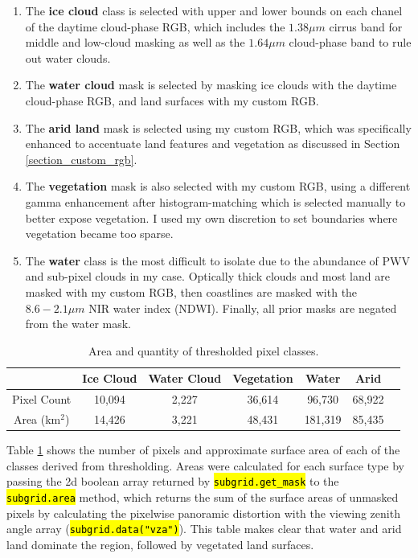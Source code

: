 \documentclass[12pt]{article}
\newcommand{\hltexttt}[1]{\texttt{\hl{#1}}}
\begin{document}
\begin{enumerate}
    \item{The \textbf{ice cloud} class is selected with upper and lower bounds on each chanel of the daytime cloud-phase RGB, which includes the $1.38\mu m$ cirrus band for middle and low-cloud masking as well as the $1.64\mu m$ cloud-phase band to rule out water clouds.}
    \item{The \textbf{water cloud} mask is selected by masking ice clouds with the daytime cloud-phase RGB, and land surfaces with my custom RGB.}
    \item{The \textbf{arid land} mask is selected using my custom RGB, which was specifically enhanced to accentuate land features and vegetation as discussed in Section \ref{section_custom_rgb}.}
    \item{The \textbf{vegetation} mask is also selected with my custom RGB, using a different gamma enhancement after histogram-matching which is selected manually to better expose vegetation. I used my own discretion to set boundaries where vegetation became too sparse.}
    \item{The \textbf{water} class is the most difficult to isolate due to the abundance of PWV and sub-pixel clouds in my case. Optically thick clouds and most land are masked with my custom RGB, then coastlines are masked with the $8.6-2.1\mu m$ NIR water index (NDWI). Finally, all prior masks are negated from the water mask.}
\end{enumerate}

\begin{table}[h!]
    \centering
    \begin{tabular}{c|cccccc}
        & Ice Cloud & Water Cloud & Vegetation & Water & Arid \\
        \hline
        Pixel Count & 10,094 & 2,227 & 36,614 & 96,730 & 68,922\\
        Area (km$^2$)& 14,426 & 3,221 & 48,431 & 181,319 & 85,435\\
    \end{tabular}
    \caption{Area and quantity of thresholded pixel classes.}
    \label{thresh_areas}
\end{table}

Table \ref{thresh_areas} shows the number of pixels and approximate surface area of each of the classes derived from thresholding. Areas were calculated for each surface type by passing the 2d boolean array returned by \hltexttt{subgrid.get\_mask} to the \hltexttt{subgrid.area} method, which returns the sum of the surface areas of unmasked pixels by calculating the pixelwise panoramic distortion with the viewing zenith angle array (\hltexttt{subgrid.data("vza")}). This table makes clear that water and arid land dominate the region, followed by vegetated land surfaces.
\end{document}

